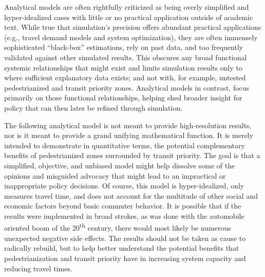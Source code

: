 \documentclass{elsarticle}\usepackage[]{graphicx}\usepackage[]{color}
\begin{document}
Analytical models are often rightfully criticized as being overly simplified and hyper-idealized cases with little or no practical application outside of academic text. While true that simulation's precision offers abundant practical applications (e.g., travel demand models and system optimization), they are often immensely sophisticated ``black-box'' estimations, rely on past data, and too frequently validated against other simulated results. This obscures any broad functional systemic relationships that might exist and limits simulation results only to where sufficient explanatory data exists; and not with, for example, untested pedestrianized and transit priority zones. Analytical models in contrast, focus primarily on those functional relationships, helping shed broader insight for policy that can then later be refined through simulation. 

The following analytical model is not meant to provide high-resolution results, nor is it meant to provide a grand unifying mathematical function. It is merely intended to demonstrate in quantitative terms, the potential complementary benefits of pedestrianized zones surrounded by transit priority. The goal is that a simplified, objective, and unbiased model might help dissolve some of the opinions and misguided advocacy that might lead to an impractical or inappropriate policy decisions. Of course, this model is hyper-idealized, only measures travel time, and does not account for the multitude of other social and economic factors beyond basic commuter behavior. It is possible that if the results were implemented in broad strokes, as was done with the automobile oriented boom of the 20\textsuperscript{th} century, there would most likely be numerous unexpected negative side effects. The results should not be taken as cause to radically rebuild, but to help better understand the potential benefits that pedestrianization and transit priority have in increasing system capacity and reducing travel times. 
\end{document}
